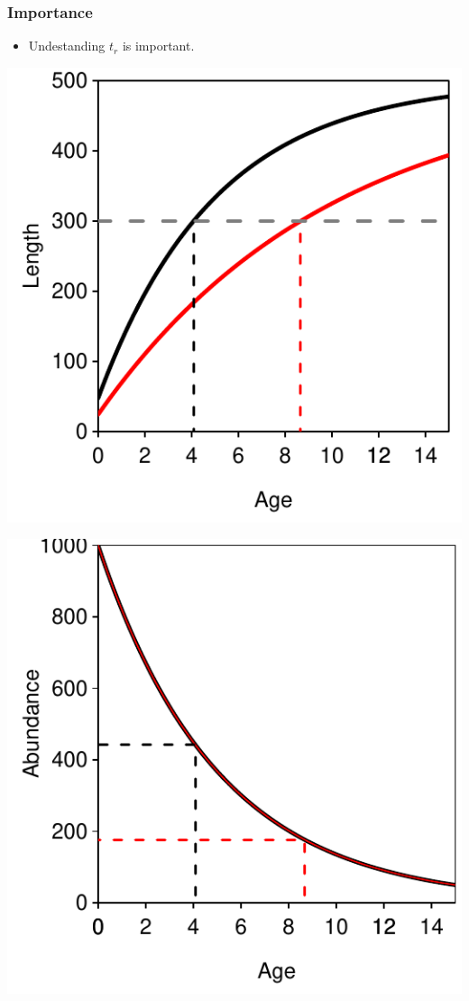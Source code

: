 \documentclass[xcolor=dvipsnames,t]{beamer}\usepackage[]{graphicx}\usepackage[]{color}
\newenvironment{knitrout}{}{} %
\begin{document}
\begin{frame}[fragile]
\frametitle{Importance}
\begin{itemize}
  \item Undestanding $t_{r}$ is important.
  \pause
  \bigskip
  \bigskip
\end{itemize}

\hspace*{-1cm}
\begin{minipage}{0.7\textwidth}
\begin{knitrout}\footnotesize
{}\color{fgcolor}

{\centering \includegraphics[width=.5\linewidth]{Figs/unnamed-chunk-1-1} 

}



\end{knitrout}
\end{minipage}%
\pause
\hspace*{-3cm}
\begin{minipage}{0.7\textwidth}
\begin{knitrout}\footnotesize
{}\color{fgcolor}

{\centering \includegraphics[width=.5\linewidth]{Figs/unnamed-chunk-2-1} 

}



\end{knitrout}
\end{minipage}
\end{frame}
\end{document}
